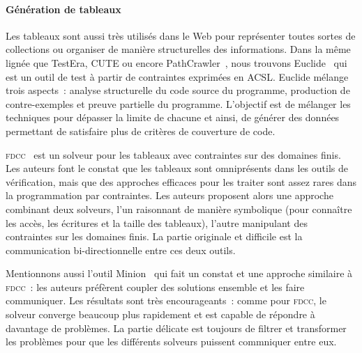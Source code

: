 \paragraph{Génération de tableaux} Les tableaux sont aussi très utilisés dans le
Web pour représenter toutes sortes de collections ou organiser de manière
structurelles des informations. Dans la même lignée que TestEra, CUTE ou encore
PathCrawler~, nous trouvons Euclide~ qui
est un outil de test à partir de contraintes exprimées en ACSL. Euclide mélange
trois aspects~: analyse structurelle du code source du programme, production de
contre-exemples et preuve partielle du programme. L'objectif est de mélanger les
techniques pour dépasser la limite de chacune et ainsi, de générer des données
permettant de satisfaire plus de critères de couverture de code.

{\scshape fdcc}~ est un solveur pour les tableaux avec
contraintes sur des domaines finis. Les auteurs font le constat que les tableaux
sont omniprésents dans les outils de vérification, mais que des approches
efficaces pour les traiter sont assez rares dans la programmation par
contraintes. Les auteurs proposent alors une approche combinant deux solveurs,
l'un raisonnant de manière symbolique (pour connaître les accès, les écritures
et la taille des tableaux), l'autre manipulant des contraintes sur les domaines
finis. La partie originale et difficile est la communication bi-directionnelle
entre ces deux outils.

Mentionnons aussi l'outil Minion~ qui fait un constat et une
approche similaire à {\scshape fdcc}~: les auteurs préfèrent coupler des
solutions ensemble et les faire communiquer. Les résultats sont très
encourageants~: comme pour {\scshape fdcc}, le solveur converge beaucoup plus
rapidement et est capable de répondre à davantage de problèmes. La partie
délicate est toujours de filtrer et transformer les problèmes pour que les
différents solveurs puissent commniquer entre eux.
